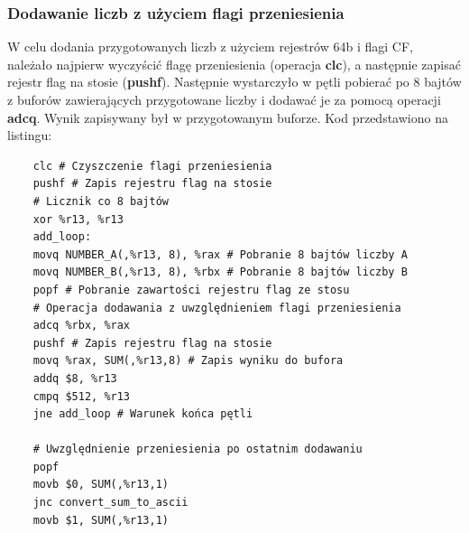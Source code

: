 \documentclass[a4paper,12pt]{article}
\begin{document}
\subsubsection{Dodawanie liczb z użyciem flagi przeniesienia}
W celu dodania przygotowanych liczb z użyciem rejestrów 64b i flagi CF, należało najpierw wyczyścić flagę przeniesienia (operacja \textbf{clc}), a następnie zapisać rejestr flag na stosie (\textbf{pushf}). Następnie wystarczyło w pętli pobierać po 8 bajtów z buforów zawierających przygotowane liczby i dodawać je za pomocą operacji \textbf{adcq}. Wynik zapisywany był w przygotowanym buforze. Kod przedstawiono na listingu:
\begin{verbatim}
	clc # Czyszczenie flagi przeniesienia
	pushf # Zapis rejestru flag na stosie
	# Licznik co 8 bajtów
	xor %r13, %r13
	add_loop:
	movq NUMBER_A(,%r13, 8), %rax # Pobranie 8 bajtów liczby A
	movq NUMBER_B(,%r13, 8), %rbx # Pobranie 8 bajtów liczby B
	popf # Pobranie zawartości rejestru flag ze stosu
	# Operacja dodawania z uwzględnieniem flagi przeniesienia
	adcq %rbx, %rax
	pushf # Zapis rejestru flag na stosie
	movq %rax, SUM(,%r13,8) # Zapis wyniku do bufora
	addq $8, %r13
	cmpq $512, %r13 
	jne add_loop # Warunek końca pętli
	
	# Uwzględnienie przeniesienia po ostatnim dodawaniu
	popf
	movb $0, SUM(,%r13,1)
	jnc convert_sum_to_ascii
	movb $1, SUM(,%r13,1)
\end{verbatim}
\end{document}

